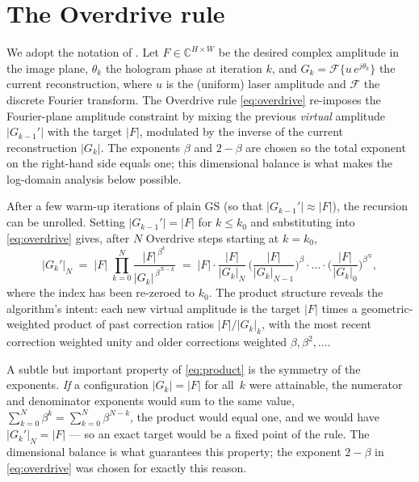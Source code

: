 \documentclass[11pt,a4paper]{article}
\newcommand{\F}{\lvert F\rvert}
\newcommand{\Gk}{\lvert G_k\rvert}
\newcommand{\Gkm}{\lvert G_{k-1}'\rvert}
\newcommand{\Gkp}{\lvert G_k'\rvert}
\begin{document}
\section{The Overdrive rule}\label{sec:rule}

We adopt the notation of \cite{Bernau2012}. Let $F\in\mathbb{C}^{H\times W}$ be
the desired complex amplitude in the image plane, $\theta_k$ the hologram
phase at iteration $k$, and $G_k=\mathcal{F}\{u\,e^{j\theta_k}\}$ the current
reconstruction, where $u$ is the (uniform) laser amplitude and $\mathcal{F}$
the discrete Fourier transform. The Overdrive rule \eqref{eq:overdrive}
re-imposes the Fourier-plane amplitude constraint by mixing the previous
\emph{virtual} amplitude $\Gkm$ with the target $\F$, modulated by the inverse
of the current reconstruction $\Gk$. The exponents $\beta$ and $2-\beta$ are
chosen so the total exponent on the right-hand side equals one; this
dimensional balance is what makes the log-domain analysis below possible.

After a few warm-up iterations of plain GS (so that $\Gkm\approx\F$), the
recursion can be unrolled. Setting $\Gkm = \F$ for $k\le k_0$ and substituting
into \eqref{eq:overdrive} gives, after $N$ Overdrive steps starting at
$k=k_0$,
\begin{equation}
  \Gkp_N \;=\; \F\;\prod_{k=0}^{N}
            \frac{\F^{\,\beta^{k}}}{\Gk^{\,\beta^{N-k}}}
        \;=\; \F\cdot\frac{\F}{\Gk_N}\,
                  \biggl(\frac{\F}{\Gk_{N-1}}\biggr)^{\!\beta}\!\cdot\ldots
                  \cdot\biggl(\frac{\F}{\Gk_0}\biggr)^{\!\beta^N}\!\!\!,
  \label{eq:product}
\end{equation}
where the index has been re-zeroed to $k_0$. The product structure reveals
the algorithm's intent: each new virtual amplitude is the target $\F$ times a
geometric-weighted product of past correction ratios $\F/\Gk_k$, with the most
recent correction weighted unity and older corrections weighted $\beta,
\beta^2,\ldots$.

A subtle but important property of \eqref{eq:product} is the symmetry of the
exponents. \emph{If} a configuration $\Gk=\F$ for all~$k$ were attainable,
the numerator and denominator exponents would sum to the same value,
$\sum_{k=0}^{N}\beta^{k}=\sum_{k=0}^{N}\beta^{N-k}$, the product would equal
one, and we would have $\Gkp_N=\F$ --- so an exact target would be a fixed
point of the rule. The dimensional balance is what guarantees this property;
the exponent $2-\beta$ in \eqref{eq:overdrive} was chosen for exactly this
reason.
\end{document}
